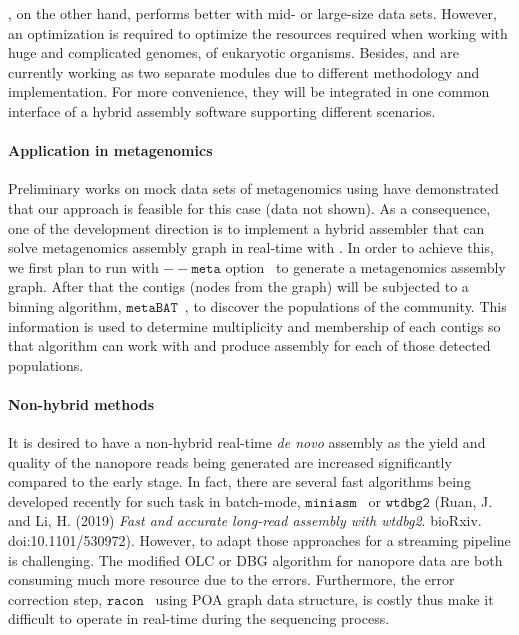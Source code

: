 \npscarf{}, on the other hand, performs better with mid- or large-size data sets. However, an optimization is required to optimize the resources required when working with huge and complicated genomes, \EG{} of eukaryotic organisms.
Besides, \npscarf{} and \npgraph{} are currently working as two separate modules due to different methodology and implementation. For more convenience, they will be integrated in one common interface of a hybrid assembly software supporting different scenarios.

\paragraph{Application in metagenomics}
Preliminary works on mock data sets of metagenomics using \npscarf{} have demonstrated that our approach is feasible for this case (data not shown).
As a consequence, one of the development direction is to implement a hybrid assembler that can solve metagenomics assembly graph in real-time with \npgraph{}.
In order to achieve this, we first plan to run \spades{} with $\mathtt{--meta}$ option~\cite{Nurk2017metaspades} to generate a metagenomics assembly graph. After that the contigs (nodes from the graph) will be subjected to a binning algorithm, \EG{} $\mathtt{metaBAT}$~\cite{Kang2015metabat}, to discover the populations of the community.
This information is used to determine multiplicity and membership of each contigs so that \npgraph{} algorithm can work with and produce assembly for each of those detected populations.

\paragraph{Non-hybrid methods}
It is desired to have a non-hybrid real-time \emph{de novo} assembly as the yield and quality of the nanopore reads being generated are increased significantly compared to the early stage. 
In fact, there are several fast algorithms being developed recently for such task in batch-mode, \IE{} $\mathtt{miniasm}$~\cite{Li2016} or $\mathtt{wtdbg2}$ (Ruan, J. and Li, H. (2019) \emph{Fast and accurate long-read assembly with wtdbg2}. bioRxiv. doi:10.1101/530972).
However, to adapt those approaches for a streaming pipeline is challenging.
The modified OLC or DBG algorithm for nanopore data are both consuming much more resource due to the errors.
Furthermore, the error correction step, \EG{} $\mathtt{racon}$~\cite{Vaser2017racon} using POA graph data structure, is costly thus make it difficult to operate in real-time during the sequencing process.
